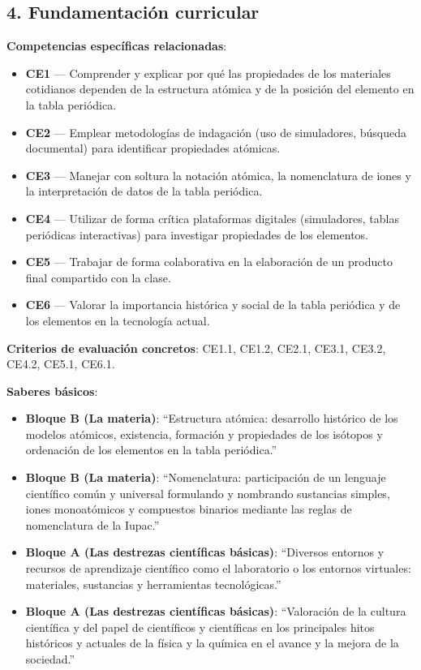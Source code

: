 \documentclass[11pt,a4paper]{article}
\begin{document}
\subsection*{4. Fundamentación curricular}
\textbf{Competencias específicas relacionadas}:
\begin{itemize}
    \item \textbf{CE1} --- Comprender y explicar por qué las propiedades de los materiales cotidianos dependen de la estructura atómica y de la posición del elemento en la tabla periódica.
    \item \textbf{CE2} --- Emplear metodologías de indagación (uso de simuladores, búsqueda documental) para identificar propiedades atómicas.
    \item \textbf{CE3} --- Manejar con soltura la notación atómica, la nomenclatura de iones y la interpretación de datos de la tabla periódica.
    \item \textbf{CE4} --- Utilizar de forma crítica plataformas digitales (simuladores, tablas periódicas interactivas) para investigar propiedades de los elementos.
    \item \textbf{CE5} --- Trabajar de forma colaborativa en la elaboración de un producto final compartido con la clase.
    \item \textbf{CE6} --- Valorar la importancia histórica y social de la tabla periódica y de los elementos en la tecnología actual.
\end{itemize}

\textbf{Criterios de evaluación concretos}: CE1.1, CE1.2, CE2.1, CE3.1, CE3.2, CE4.2, CE5.1, CE6.1.

\textbf{Saberes básicos}:
\begin{itemize}
    \item \textbf{Bloque B (La materia)}: ``Estructura atómica: desarrollo histórico de los modelos atómicos, existencia, formación y propiedades de los isótopos y ordenación de los elementos en la tabla periódica.''
    \item \textbf{Bloque B (La materia)}: ``Nomenclatura: participación de un lenguaje científico común y universal formulando y nombrando sustancias simples, iones monoatómicos y compuestos binarios mediante las reglas de nomenclatura de la Iupac.''
    \item \textbf{Bloque A (Las destrezas científicas básicas)}: ``Diversos entornos y recursos de aprendizaje científico como el laboratorio o los entornos virtuales: materiales, sustancias y herramientas tecnológicas.''
    \item \textbf{Bloque A (Las destrezas científicas básicas)}: ``Valoración de la cultura científica y del papel de científicos y científicas en los principales hitos históricos y actuales de la física y la química en el avance y la mejora de la sociedad.''
\end{itemize}
\end{document}
